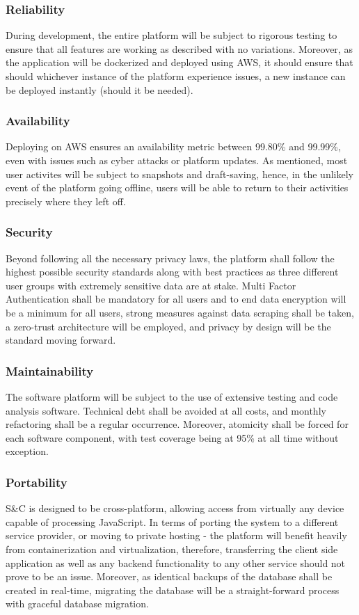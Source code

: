 \subsubsection{Reliability}
During development, the entire platform will be subject to rigorous testing to ensure that all features are working as described with no variations. Moreover, as the application will be dockerized and deployed using AWS, it should ensure that should whichever instance of the platform experience issues, a new instance can be deployed instantly (should it be needed). 
\subsubsection{Availability}
Deploying on AWS ensures an availability metric between 99.80\% and 99.99\%, even with issues such as cyber attacks or platform updates. As mentioned, most user activites will be subject to snapshots and draft-saving, hence, in the unlikely event of the platform going offline, users will be able to return to their activities precisely where they left off.
\subsubsection{Security}
Beyond following all the necessary privacy laws, the platform shall follow the highest possible security standards along with best practices as three different user groups with extremely sensitive data are at stake. Multi Factor Authentication shall be mandatory for all users and to end data encryption will be a minimum for all users, strong measures against data scraping shall be taken, a zero-trust architecture will be employed, and privacy by design will be the standard moving forward.
\subsubsection{Maintainability}
The software platform will be subject to the use of extensive testing and code analysis software. Technical debt shall be avoided at all costs, and monthly refactoring shall be a regular occurrence. Moreover, atomicity shall be forced for each software component, with test coverage being at 95\% at all time without exception.
\subsubsection{Portability}
S&C is designed to be cross-platform, allowing access from virtually any device capable of processing JavaScript. In terms of porting the system to a different service provider, or moving to private hosting - the platform will benefit heavily from containerization and virtualization, therefore, transferring the client side application as well as any backend functionality to any other service should not prove to be an issue. Moreover, as identical backups of the database shall be created in real-time, migrating the database will be a straight-forward process with graceful database migration.
